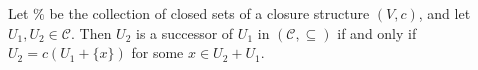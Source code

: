 Let $\%$ be the collection of closed sets of a closure structure $(V, c)$, and let $U_1, U_2 \in \mathcal{C}$. Then $U_2$ is a successor of $U_1$ in $(\mathcal{C}, \subseteq)$ if and only if $U_2 = c(U_1 + \{x\})$ for some $x \in U_2 + U_1$.
